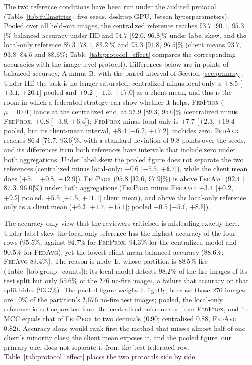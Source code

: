 \documentclass[journal]{IEEEtran}
\newcommand{\fedavg}{\textsc{FedAvg}}
\newcommand{\fedprox}{\textsc{FedProx}}
\begin{document}
The two reference conditions have been run under the audited protocol (Table~\ref{tab:fullmetrics}; five seeds, desktop GPU, Jetson hyperparameters). Pooled over all held-out images, the centralized reference reaches $93.7$ [$90.1$, $95.3$]\% balanced accuracy under IID and $94.7$ [$92.0$, $96.8$]\% under label skew, and the local-only reference $85.3$ [$78.1$, $88.2$]\% and $95.3$ [$91.8$, $96.5$]\% (client means $93.7$, $93.8$, $84.5$ and $88.6$\%; Table~\ref{tab:protocol_effect} compares the corresponding accuracies with the image-level protocol). Differences below are in points of balanced accuracy, A minus B, with the paired interval of Section~\ref{sec:primary}. Under IID the task is no longer saturated: centralized minus local-only is $+8.5$ [$+3.1$, $+20.1$] pooled and $+9.2$ [$-1.5$, $+17.0$] as a client mean, and this is the room in which a federated strategy can show whether it helps. \fedprox{} ($\mu=0.01$) lands at the centralized end, at $92.9$ [$89.3$, $95.0$]\% (centralized minus \fedprox{}: $+0.8$ [$-3.8$, $+6.4$]); \fedprox{} minus local-only is $+7.7$ [$+2.3$, $+19.4$] pooled, but its client-mean interval, $+8.4$ [$-6.2$, $+17.2$], includes zero. \fedavg{} reaches $86.4$ [$76.7$, $93.6$]\%, with a standard deviation of $9.8$ points over the seeds, and its differences from both references have intervals that include zero under both aggregations. Under label skew the pooled figure does not separate the two references (centralized minus local-only: $-0.6$ [$-5.5$, $+6.7$]), while the client mean does ($+5.1$ [$+0.8$, $+12.9$]). \fedprox{} ($95.8$ [$92.6$, $97.9$]\%) is above \fedavg{} ($92.4$ [$87.3$, $96.0$]\%) under both aggregations (\fedprox{} minus \fedavg{}: $+3.4$ [$+0.2$, $+9.2$] pooled, $+5.5$ [$+1.5$, $+11.1$] client mean), and above the local-only reference only as a client mean ($+6.3$ [$+1.7$, $+15.1$]; pooled $+0.5$ [$-5.6$, $+8.8$]).

The accuracy-only view that the reviewers criticised is misleading exactly here. Under label skew the local-only reference has the highest accuracy of the four rows ($95.5$\%, against $94.7$\% for \fedprox{}, $94.3$\% for the centralized model and $90.5$\% for \fedavg{}), yet the lowest client-mean balanced accuracy ($88.6$\%; \fedavg{} $89.4$\%). The reason is node~B, whose partition is 88.5\% fire (Table~\ref{tab:group_counts}): its local model detects $98.2$\% of the fire images of its test split but only $55.6$\% of the 276 no-fire images, a failure that accuracy on that split hides ($93.3$\%). The pooled figure weighs it lightly, because those 276 images are 10\% of the partition's 2{,}676 no-fire test images; pooled, the local-only reference is not separated from the centralized reference or from \fedprox{}, and its MCC equals that of \fedprox{} to two decimals ($0.90$; centralized $0.88$, \fedavg{} $0.82$). Accuracy alone would rank first the method that misses almost half of one client's minority class; the client mean exposes it, and the pooled figure, our primary one, does not separate it from the best federated row. Table~\ref{tab:protocol_effect} places the two protocols side by side.
\end{document}
